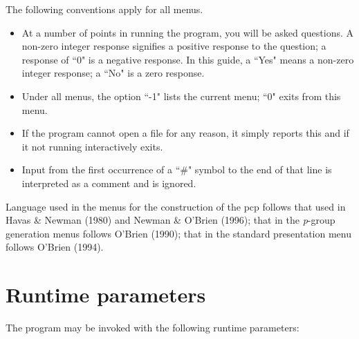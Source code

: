 The following conventions apply for all menus.
\begin{itemize}
\item At a number of points in running the program, you will
be asked questions.  A non-zero integer response signifies a positive 
response to the question; a response of ``0" is a negative response.
In this guide, a ``Yes" means a non-zero integer response;
a ``No" is a zero response.

\item 
Under all menus, the option  ``-1" lists the current menu; 
``0" exits from this menu.

\item If the program cannot open a file for any reason, it simply 
reports this and if it not running interactively exits.

\item Input from the first occurrence of a ``\#" symbol to the 
      end of that line is interpreted as a comment and is ignored. 
\end{itemize}

Language used in the menus for the construction of the pcp 
follows that used in Havas \& Newman (1980) and 
Newman \& O'Brien (1996);
that in the {\it p}-group generation menus follows O'Brien (1990);
that in the standard presentation menu follows O'Brien (1994).

\section{Runtime parameters}
The program may be invoked with the following runtime parameters: 


